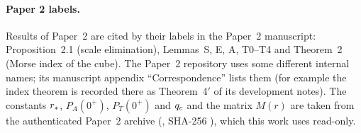 \paragraph{Paper 2 labels.} Results of Paper~2 \citep{Paper2} are cited by their labels in the Paper~2 manuscript:
Proposition~2.1 (scale elimination), Lemmas~S, E, A, T0--T4 and Theorem~2 (Morse index of the cube). The Paper~2
repository uses some different internal names; its manuscript appendix ``Correspondence'' lists them (for example the
index theorem is recorded there as Theorem~4$'$ of its development notes). The constants $r_{*}$, $P_A(0^+)$,
$P_T(0^+)$ and $q_{c}$ and the matrix $M(r)$ are taken from the authenticated Paper~2 archive
(, SHA-256
), which this work uses read-only.
